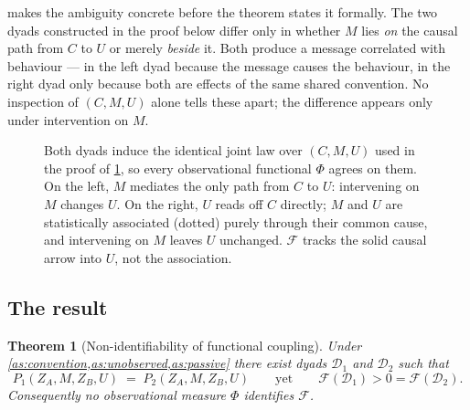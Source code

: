 \documentclass[11pt,a4paper]{article}
\theoremstyle{plain}
\newtheorem{theorem}{Theorem}
\theoremstyle{definition}
\theoremstyle{remark}
\newcommand{\Fc}{\mathcal{F}}
\newcommand{\Dy}{\mathcal{D}}
\begin{document}
 makes the ambiguity concrete before the theorem states it formally. The two
dyads constructed in the proof below differ only in whether $M$ lies \emph{on} the causal
path from $C$ to $U$ or merely \emph{beside} it. Both produce a message correlated with
behaviour --- in the left dyad because the message causes the behaviour, in the right dyad
only because both are effects of the same shared convention. No inspection of $(C, M, U)$
alone tells these apart; the difference appears only under intervention on $M$.

\begin{figure}[t]
\centering
{}
\hspace{18mm}
\caption{Both dyads induce the identical joint law over $(C,M,U)$ used in the proof of
\cref{thm:nonid}, so every observational functional $\Phi$ agrees on them. On the left, $M$
mediates the only path from $C$ to $U$: intervening on $M$ changes $U$. On the right, $U$
reads off $C$ directly; $M$ and $U$ are statistically associated (dotted) purely through
their common cause, and intervening on $M$ leaves $U$ unchanged. $\Fc$ tracks the solid
causal arrow into $U$, not the association.}
\label{fig:dags}
\end{figure}

\subsection{The result}

\begin{theorem}[Non-identifiability of functional coupling]\label{thm:nonid}
Under \cref{as:convention,as:unobserved,as:passive} there exist dyads $\Dy_1$ and $\Dy_2$
such that
\[
P_1(Z_A, M, Z_B, U) \;=\; P_2(Z_A, M, Z_B, U)
\qquad\text{yet}\qquad
\Fc(\Dy_1) > 0 = \Fc(\Dy_2).
\]
Consequently no observational measure $\Phi$ identifies $\Fc$.
\end{theorem}
\end{document}
